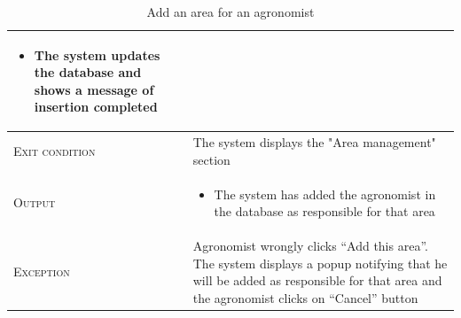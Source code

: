 \begin{table}[H]
\begin{tabular}[c]{|l|p{}|}
\begin{itemize}
                                    		\item The system updates the database and shows a message of insertion completed
                                        \end{itemize}\\
        \hline %
        \textsc{Exit condition}    &  The system displays the "Area management" section\\
    	\hline %
    	\textsc{Output}             &  \begin{itemize}
    	    \item The system has added the agronomist in the database as responsible for that area
    	\end{itemize}\\
    	\hline %
    	\textsc{Exception}         &  Agronomist wrongly clicks “Add this area”. The system displays a popup notifying that he will be added as responsible for that area and the agronomist clicks on “Cancel” button\\
    	\hline %
        
    \end{tabular}
    \caption{\label{tab:responsible_area_insertion}Add an area for an agronomist}
\end{table}


